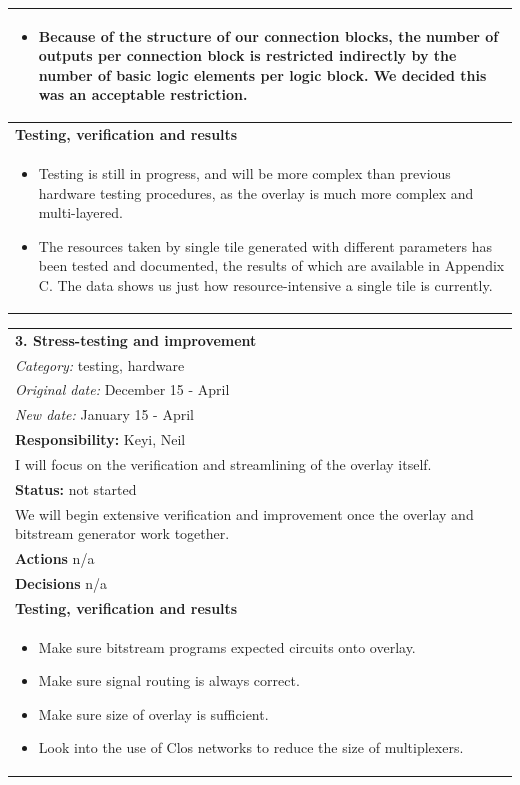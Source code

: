\documentclass[12pt,letterpaper]{article}
\begin{document}
\begin{tabular}{|p{6.4in}|}
\begin{itemize}
\item Because of the structure of our connection blocks, the number of outputs per connection block is restricted indirectly by the number of basic logic elements per logic block.
We decided this was an acceptable restriction.
\end{itemize}
\vspace{-1em} \\
\hline
\textbf{Testing, verification and results} \\
\vspace{-1em}
\begin{itemize}
\item Testing is still in progress, and will be more complex than previous hardware testing procedures, as the overlay is much more complex and multi-layered.
\item The resources taken by single tile generated with different parameters has been tested and documented, the results of which are available in Appendix C. The data shows us just how resource-intensive a single tile is currently.
\end{itemize} 
\vspace{-1em} \\
\hline
\end{tabular}

\begin{tabular}{|p{6.4in}|}
\hline
\textbf{3. Stress-testing and improvement} \\
\emph{Category:} testing, hardware \\
\emph{Original date:} December 15 - April \\
\emph{New date:} January 15 - April \\
\hline
\textbf{Responsibility:} Keyi, Neil \\
I will focus on the verification and streamlining of the overlay itself. \\
\hline
\textbf{Status:} not started \\
We will begin extensive verification and improvement once the overlay and bitstream generator work together. \\
\hline
\textbf{Actions} n/a \\
\hline
\textbf{Decisions} n/a \\
\hline
\textbf{Testing, verification and results} \\
\vspace{-1em}
\begin{itemize}
\item Make sure bitstream programs expected circuits onto overlay.
\item Make sure signal routing is always correct.
\item Make sure size of overlay is sufficient.
\item Look into the use of Clos networks to reduce the size of multiplexers.
\end{itemize} 
\vspace{-1em} \\
\hline
\end{tabular}
\end{document}
